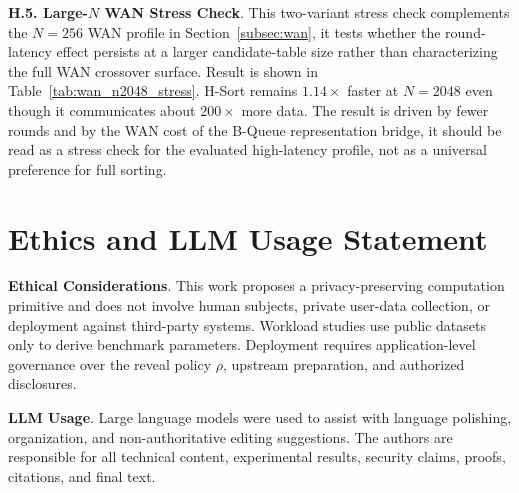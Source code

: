\documentclass[conference,compsoc,letterpaper]{IEEEtran}
\theoremstyle{definition}
\theoremstyle{remark}
\newcommand{\myparagraph}[1]{\noindent \textbf{#1}.}
\newcommand{\policy}{\rho}
\newcommand{\HSort}{H-Sort}
\newcommand{\BQueue}{B-Queue}
\begin{document}
\smallskip
\myparagraph{H.5. Large-$N$ WAN Stress Check}
\label{app:wan_n2048_stress}
This two-variant stress check complements the \(N=256\) WAN profile in Section~\ref{subsec:wan}, it tests whether the round-latency effect persists at a larger candidate-table size rather than characterizing the full WAN crossover surface. Result is shown in Table~\ref{tab:wan_n2048_stress}.
\HSort{} remains \(1.14\times\) faster at \(N=2048\) even though it communicates about \(200\times\) more data.
The result is driven by fewer rounds and by the WAN cost of the \BQueue{} representation bridge, it should be read as a stress check for the evaluated high-latency profile, not as a universal preference for full sorting.

\vspace{-2mm}
\section*{Ethics and LLM Usage Statement}
\vspace{-2mm}
\myparagraph{Ethical Considerations}
This work proposes a privacy-preserving computation primitive and does not involve human subjects, private user-data collection, or deployment against third-party systems.
Workload studies use public datasets only to derive benchmark parameters.
Deployment requires application-level governance over the reveal policy $\policy$, upstream preparation, and authorized disclosures.

\smallskip
\myparagraph{LLM Usage}
Large language models were used to assist with language polishing, organization, and non-authoritative editing suggestions.
The authors are responsible for all technical content, experimental results, security claims, proofs, citations, and final text.
\end{document}
